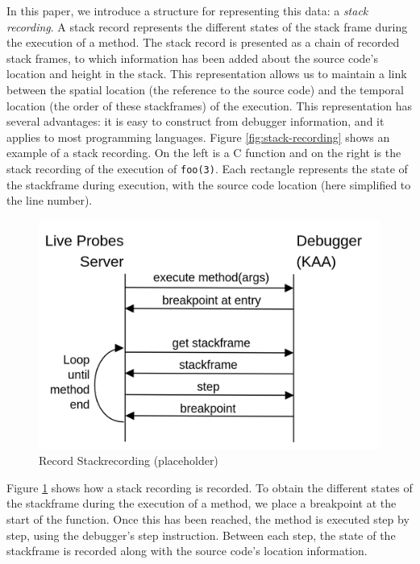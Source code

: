 \documentclass[english,submission]{programming}
\newcommand{\code}[1]{\colorbox{codegray}{\texttt{#1}}}
\begin{document}
In this paper, we introduce a structure for representing this data: a \textit{stack recording}. 
A stack record represents the different states of the stack frame during the execution of a method. The stack record is presented as a chain of recorded stack frames, to which information has been added about the source code's location and height in the stack.
This representation allows us to maintain a link between the spatial location (the reference to the source code) and the temporal location (the order of these stackframes) of the execution.
This representation has several advantages: it is easy to construct from debugger information, and it applies to most programming languages.
Figure \ref{fig:stack-recording} shows an example of a stack recording. On the left is a C function and on the right is the stack recording of the execution of \code{foo(3)}. Each rectangle represents the state of the stackframe during execution, with the source code location (here simplified to the line number).

\begin{figure}[h]
  \centering
  \includegraphics[width=0.6\linewidth]{img/stackrecording_impl.png}
  \caption{Record Stackrecording (placeholder)}
  \label{fig:stack-recording-impl}
\end{figure}

Figure \ref{fig:stack-recording-impl} shows how a stack recording is recorded.
To obtain the different states of the stackframe during the execution of a method, we place a breakpoint at the start of the function. 
Once this has been reached, the method is executed step by step, using the debugger's step instruction. 
Between each step, the state of the stackframe is recorded along with the source code's location information.
\end{document}
